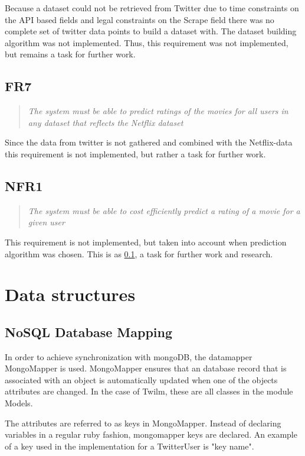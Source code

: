 Because a dataset could not be retrieved from Twitter due to time constraints on the API based fields and legal constraints on the Scrape field there was no complete set of twitter data points to build a dataset with. The dataset building algorithm was not implemented. Thus, this requirement was not implemented, but remains a task for further work.

\subsection{FR7}\label{subsec:FR7}
\begin{quotation}
\em The system must be able to predict ratings of the movies for all users in any dataset that reflects the Netflix dataset %
\end{quotation}

Since the data from twitter is not gathered and combined with the Netflix-data this requirement is not implemented, but rather a task for further work.

\subsection{NFR1}
\begin{quotation}
\em The system must be able to cost efficiently predict a rating of a movie for a given user %
\end{quotation}

This requirement is not implemented, but taken into account when prediction algorithm was chosen. This is as \ref{subsec:FR7}, a task for further work and research.


\section{Data structures}\label{impl:Data structures}
\subsection{NoSQL Database Mapping}
In order to achieve synchronization with mongoDB, the datamapper MongoMapper is used. MongoMapper ensures that an database record that is associated with an object is automatically updated when one of the objects attributes are changed. In the case of Twilm, these are all classes in the module Models.

The attributes are referred to as keys in MongoMapper. Instead of declaring variables in a regular ruby fashion, mongomapper keys are declared. An example of a key used in the implementation for a TwitterUser is "key name".

